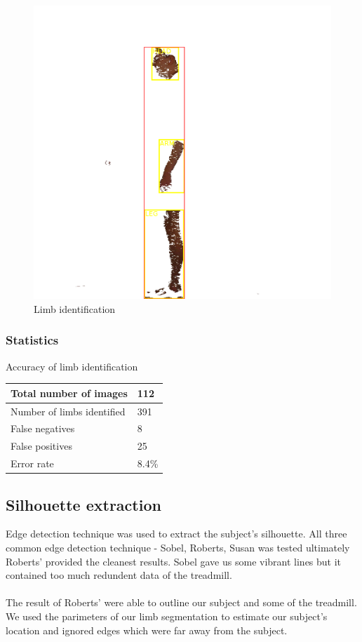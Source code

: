 \documentclass[10pt,journal,compsoc]{IEEEtran}
\begin{document}
\begin{figure}[!htb]
\centering
\includegraphics[width=0.7\linewidth]{segment_analysis}
\caption{Limb identification}
\end{figure}

\subsubsection{Statistics}
Accuracy of limb identification

\begin{center}
 \begin{tabular}{||l | l||} 
 \hline
 Total number of images &  112 \\ 
 \hline
 Number of limbs identified & 391 \\ 
 \hline
 False negatives & 8 \\
 \hline
 False positives & 25 \\
 \hline
 Error rate & 8.4\% \\
 \hline
\end{tabular}
\end{center}


\subsection{Silhouette extraction}
Edge detection technique was used to extract the subject's silhouette. All three common edge detection technique - Sobel, Roberts, Susan was tested ultimately Roberts' provided the cleanest results. Sobel gave us some vibrant lines but it contained too much redundent data of the treadmill.
\\ \\
The result of Roberts' were able to outline our subject and some of the treadmill. We used the parimeters of our limb segmentation to estimate our subject's location and ignored edges which were far away from the subject.
\end{document}
